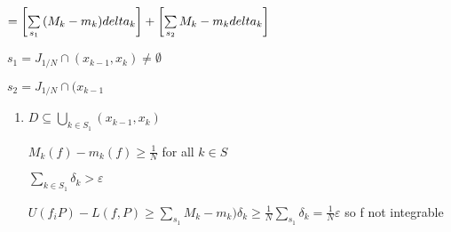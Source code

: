 \documentclass[letterpaper]{article}
\begin{document}
$=\left[\sum\limits_{s_1}{(M_k-m_k)\\delta_k}\right]+\left[\sum\limits_{s_2}{M_k-m_k\\delta_k}\right]$

$s_1=J_{1/N}\cap(x_{k-1},x_k)\ne\emptyset$

$s_2=J_{1/N}\cap(x_{k-1}$

\begin{enumerate}
\item
$D\subseteq \bigcup_{k\in S_1}(x_{k-1},x_k)$

$M_k(f)-m_k(f)\ge \frac{1}{N}$ for all $k\in S$

$\sum\limits_{k\in S_1}{\delta_k}>\varepsilon$

$U(f_iP)-L(f,P)\ge \sum\limits_{s_1}{M_k-m_k)\delta_k}\ge \frac{1}{N}\sum\limits_{s_1}{\delta_k}=\frac{1}{N}\varepsilon$ so f not integrable
\end{enumerate}
\end{document}
